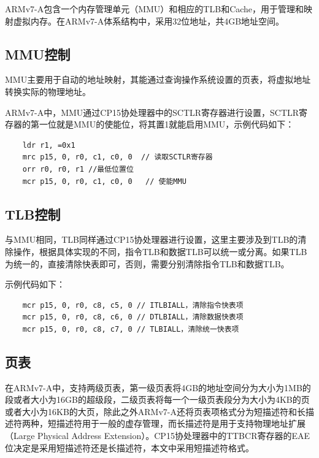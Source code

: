 \documentclass[a4paper, 12pt]{report}
\begin{document}
    ARMv7-A包含一个内存管理单元（MMU）和相应的TLB和Cache，用于管理和映射虚拟内存。在ARMv7-A体系结构中，采用32位地址，共4GB地址空间。
    
    \subsection{MMU控制}
    
    MMU主要用于自动的地址映射，其能通过查询操作系统设置的页表，将虚拟地址转换实际的物理地址。

    ARMv7-A中，MMU通过CP15协处理器中的SCTLR寄存器进行设置，SCTLR寄存器的第一位就是MMU的使能位，将其置1就能启用MMU，示例代码如下：
    
    \begin{lstlisting}
    ldr r1, =0x1
    mrc p15, 0, r0, c1, c0, 0  // 读取SCTLR寄存器
    orr r0, r0, r1 //最低位置位
    mcr p15, 0, r0, c1, c0, 0	// 使能MMU
    \end{lstlisting}
    
    \subsection{TLB控制}
    
    与MMU相同，TLB同样通过CP15协处理器进行设置，这里主要涉及到TLB的清除操作，根据具体实现的不同，指令TLB和数据TLB可以统一或分离。如果TLB为统一的，直接清除快表即可，否则，需要分别清除指令TLB和数据TLB。

    示例代码如下：
    
    \begin{lstlisting}
    mcr p15, 0, r0, c8, c5, 0 // ITLBIALL，清除指令快表项
    mcr p15, 0, r0, c8, c6, 0 // DTLBIALL，清除数据快表项
    mcr p15, 0, r0, c8, c7, 0 // TLBIALL，清除统一快表项
    \end{lstlisting}
    
    \subsection{页表}
    
    在ARMv7-A中，支持两级页表，第一级页表将4GB的地址空间分为大小为1MB的段或者大小为16GB的超级段，二级页表将每一个一级页表段分为大小为4KB的页或者大小为16KB的大页，除此之外ARMv7-A还将页表项格式分为短描述符和长描述符两种，短描述符用于一般的虚存管理，而长描述符是用于支持物理地址扩展（Large Physical Address Extension）。CP15协处理器中的TTBCR寄存器的EAE位决定是采用短描述符还是长描述符，本文中采用短描述符格式。
\end{document}
